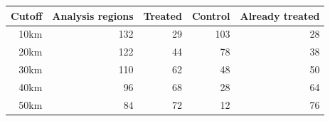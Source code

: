 \begin{tabular}{rrrrr}
\toprule
Cutoff & Analysis regions & Treated & Control & Already treated\\
\midrule
10km & 132 & 29 & 103 & 28\\
20km & 122 & 44 & 78 & 38\\
30km & 110 & 62 & 48 & 50\\
40km & 96 & 68 & 28 & 64\\
50km & 84 & 72 & 12 & 76\\
\bottomrule
\end{tabular}
